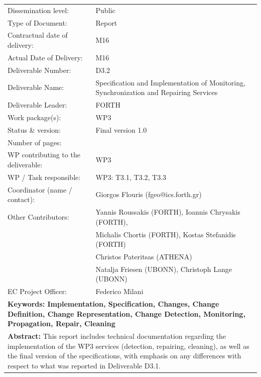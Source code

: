 \documentclass[a4paper]{article}
\begin{document}
\begin{titlepage}
\begin{center}
  \begin{tabular}{@{}|l p{9cm}|}
    \hline
    Dissemination level:  & Public \\
    Type of Document:  & Report \\
    Contractual date of delivery: & M16 \\
    Actual Date of Delivery:  & M16 \\
    Deliverable Number: & D3.2 \\
    Deliverable Name: & Specification and Implementation of Monitoring, \newline Synchronization and Repairing Services \\
    Deliverable Leader: & FORTH \\
    Work package(s): & WP3 \\
    Status \& version: & Final version 1.0\\
    Number of pages: &  \pageref{LastPage} \\
    WP contributing to the deliverable: & WP3 \\
    WP / Task responsible: & WP3: T3.1, T3.2, T3.3 \\
    Coordinator (name / contact): & Giorgos Flouris (fgeo@ics.forth.gr) \\
    Other Contributors: 
    & Yannis Roussakis (FORTH), Ioannis Chrysakis (FORTH), \\ 
    & Michalis Chortis (FORTH), Kostas Stefanidis (FORTH) \\
    & Christos Pateritsas (ATHENA) \\
    & Natalja Friesen (UBONN), Christoph Lange (UBONN) \\
    EC Project Officer: & Federico Milani \\
    \multicolumn{2}{|p{15cm}|}{\cellcolor{gray!20}
      \textbf{Keywords: Implementation, Specification, Changes, Change Definition, Change Representation, Change Detection, Monitoring, Propagation, Repair, Cleaning}
    } \\
    \multicolumn{2}{|p{15cm}|}{\cellcolor{gray!50}
      \textbf{Abstract:} \newline
      This report includes technical documentation regarding the implementation of the WP3 services (detection, repairing, cleaning), as well as the final version of the specifications, with emphasis on any differences with respect to what was reported in Deliverable D3.1.
    } \\
    \hline
  \end{tabular}
\end{center}

\end{titlepage}
\end{document}
